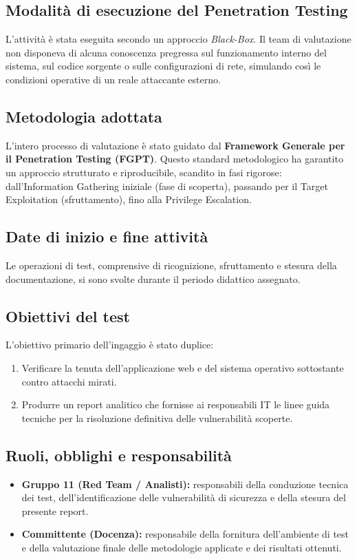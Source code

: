 \documentclass[11pt]{article}
\begin{document}
\subsection{Modalità di esecuzione del Penetration Testing}
L'attività è stata eseguita secondo un approccio \textit{Black-Box}. Il team di valutazione non disponeva di alcuna conoscenza pregressa sul funzionamento interno del sistema, sul codice sorgente o sulle configurazioni di rete, simulando così le condizioni operative di un reale attaccante esterno.

\subsection{Metodologia adottata}
L'intero processo di valutazione è stato guidato dal \textbf{Framework Generale per il Penetration Testing (FGPT)}. Questo standard metodologico ha garantito un approccio strutturato e riproducibile, scandito in fasi rigorose: dall'Information Gathering iniziale (fase di scoperta), passando per il Target Exploitation (sfruttamento), fino alla Privilege Escalation.

\subsection{Date di inizio e fine attività}
Le operazioni di test, comprensive di ricognizione, sfruttamento e stesura della documentazione, si sono svolte durante il periodo didattico assegnato. %

\subsection{Obiettivi del test}
L'obiettivo primario dell'ingaggio è stato duplice:
\begin{enumerate}
    \item Verificare la tenuta dell'applicazione web e del sistema operativo sottostante contro attacchi mirati.
    \item Produrre un report analitico che fornisse ai responsabili IT le linee guida tecniche per la risoluzione definitiva delle vulnerabilità scoperte.
\end{enumerate}

\subsection{Ruoli, obblighi e responsabilità}
\begin{itemize}
    \item \textbf{Gruppo 11 (Red Team / Analisti):} responsabili della conduzione tecnica dei test, dell'identificazione delle vulnerabilità di sicurezza e della stesura del presente report.
    \item \textbf{Committente (Docenza):} responsabile della fornitura dell'ambiente di test e della valutazione finale delle metodologie applicate e dei risultati ottenuti.
\end{itemize}
\end{document}
